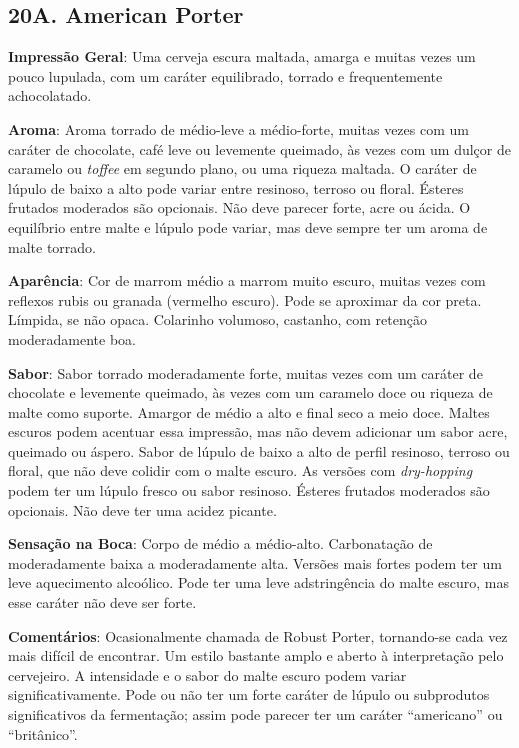 \subsection*{20A. American Porter}
\textbf{Impressão Geral}: Uma cerveja escura maltada, amarga e muitas vezes um pouco lupulada, com um caráter equilibrado, torrado e frequentemente achocolatado.

\textbf{Aroma}: Aroma torrado de médio-leve a médio-forte, muitas vezes com um caráter de chocolate, café leve ou levemente queimado, às vezes com um dulçor de caramelo ou \textit{toffee} em segundo plano, ou uma riqueza maltada. O caráter de lúpulo de baixo a alto pode variar entre resinoso, terroso ou floral. Ésteres frutados moderados são opcionais. Não deve parecer forte, acre ou ácida. O equilíbrio entre malte e lúpulo pode variar, mas deve sempre ter um aroma de malte torrado.

\textbf{Aparência}: Cor de marrom médio a marrom muito escuro, muitas vezes com reflexos rubis ou granada (vermelho escuro). Pode se aproximar da cor preta. Límpida, se não opaca. Colarinho volumoso, castanho, com retenção moderadamente boa.

\textbf{Sabor}: Sabor torrado moderadamente forte, muitas vezes com um caráter de chocolate e levemente queimado, às vezes com um caramelo doce ou riqueza de malte como suporte. Amargor de médio a alto e final seco a meio doce. Maltes escuros podem acentuar essa impressão, mas não devem adicionar um sabor acre, queimado ou áspero. Sabor de lúpulo de baixo a alto de perfil resinoso, terroso ou floral, que não deve colidir com o malte escuro. As versões com \textit{dry-hopping} podem ter um lúpulo fresco ou sabor resinoso. Ésteres frutados moderados são opcionais. Não deve ter uma acidez picante.

\textbf{Sensação na Boca}: Corpo de médio a médio-alto. Carbonatação de moderadamente baixa a moderadamente alta. Versões mais fortes podem ter um leve aquecimento alcoólico. Pode ter uma leve adstringência do malte escuro, mas esse caráter não deve ser forte.

\textbf{Comentários}: Ocasionalmente chamada de Robust Porter, tornando-se cada vez mais difícil de encontrar. Um estilo bastante amplo e aberto à interpretação pelo cervejeiro. A intensidade e o sabor do malte escuro podem variar significativamente. Pode ou não ter um forte caráter de lúpulo ou subprodutos significativos da fermentação; assim pode parecer ter um caráter “americano” ou “britânico”.

